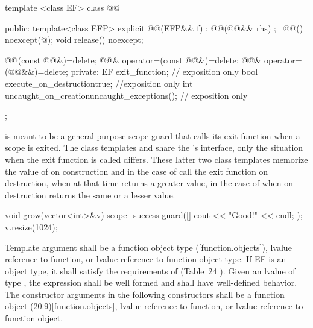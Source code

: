 \documentclass[ebook,11pt,article]{memoir}
\begin{document}
\begin{codeblock}
template <class EF>
class @@ {
public:
  template<class EFP>
  explicit @@(EFP&& f) ;
  @@(@@&& rhs) ;
  ~@@() noexcept(@\seebelow@);
  void release() noexcept;

  @@(const @@&)=delete;
  @@& operator=(const @@&)=delete;
  @@& operator=(@@&&)=delete;
private:
  EF exit_function;    // exposition only
  bool execute_on_destruction{true}; //exposition only
  int  uncaught_on_creation{uncaught_exceptions()}; // exposition only
};

\end{codeblock}
\pnum
\begin{note}
 is meant to be a general-purpose scope guard that calls its exit function when a scope is exited. The class templates  and  share the 's interface, only the situation when the exit function is called differs. These latter two class templates memorize the value of  on construction and in the case of  call the exit function on destruction, when  at that time returns a greater value, in the case of  when  on destruction returns the same or a lesser value.\\
\begin{example}
\begin{codeblock}
void grow(vector<int>&v){
	scope_success guard([]{ cout << "Good!" << endl; });
	v.resize(1024);
}
\end{codeblock}
\end{example}
\end{note}


\pnum
\requires
Template argument  shall be a function object type ([function.objects]), 
lvalue reference to function, or 
lvalue reference to function object type.
If EF is an object type, it  shall satisfy
the requirements of  (Table~24
). 
Given an lvalue  of type , the expression  shall be well formed and shall have well-defined behavior.
The constructor arguments  in the following constructors shall be a function object (20.9)[function.objects], 
lvalue reference to function, or 
lvalue reference to function object.
\end{document}
